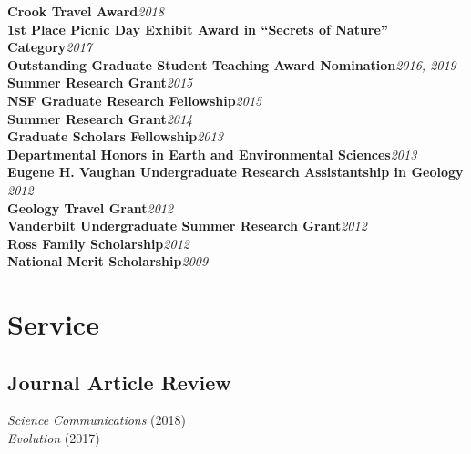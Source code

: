 \documentclass[12pt]{article}
\begin{document}
\textbf{Crook Travel Award}\hfill \emph{2018}\\
\textbf{1st Place Picnic Day Exhibit Award in “Secrets of Nature” Category}\hfill \emph{2017}\\
\textbf{Outstanding Graduate Student Teaching Award Nomination}\hfill \emph{2016, 2019}\\
\textbf{Summer Research Grant}\hfill \emph{2015}\\
\textbf{NSF Graduate Research Fellowship}\hfill \emph{2015}\\
\textbf{Summer Research Grant}\hfill \emph{2014}\\
\textbf{Graduate Scholars Fellowship}\hfill \emph{2013}\\
\textbf{Departmental Honors in Earth and Environmental Sciences}\hfill \emph{2013}\\
\textbf{Eugene H. Vaughan Undergraduate Research Assistantship in Geology }\hfill \emph{2012}\\
\textbf{Geology Travel Grant}\hfill \emph{2012}\\
\textbf{Vanderbilt Undergraduate Summer Research Grant}\hfill \emph{2012}\\
\textbf{Ross Family Scholarship}\hfill \emph{2012}\\
\textbf{National Merit Scholarship}\hfill \emph{2009}\\




\section{Service}

\subsection{Journal Article Review}

\emph{Science Communications} (2018)\\
\emph{Evolution} (2017)
\end{document}
